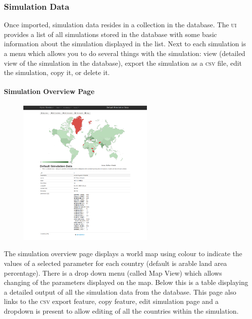 \subsubsection{Simulation Data}

Once imported, simulation data resides in a collection in the database. The \textsc{ui} provides a list of all simulations stored in the database with some basic information about the simulation displayed in the list. Next to each simulation is a menu which allows you to do several things with the simulation: view (detailed view of the simulation in the database),  export the simulation as a \textsc{csv} file, edit the simulation, copy it, or delete it.

\paragraph{Simulation Overview Page}

\begin{figure}[h!]
	\centering
	\includegraphics[width=0.6\textwidth]{img/ui2.png}
	\caption{}
\end{figure}

The simulation overview page displays a world map using colour to indicate the values of a selected parameter for each country (default is arable land area percentage). There is a drop down menu (called Map View) which allows changing of the parameters displayed on the map. Below this is a table displaying a detailed output of all the simulation data from the database. This page also links to the \textsc{csv} export feature, copy feature, edit simulation page and a dropdown is present to allow editing of all the countries within the simulation.

